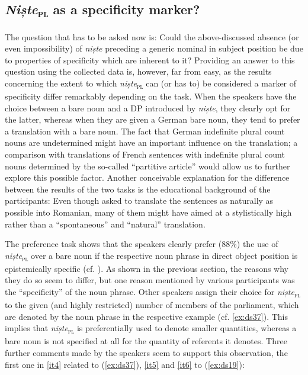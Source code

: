 \documentclass[output=paper,colorlinks,citecolor=brown]{langscibook}
\begin{document}
\subsection{\textit{Niște}\textsubscript{\textsc{pl}} as a specificity marker?}\label{sec:ds5.2}\largerpage
The question that has to be asked now is: Could the above-discussed absence (or even impossibility) of \textit{niște} preceding a generic nominal in subject position be due to properties of specificity which are inherent to it? Providing an answer to this question using the collected data is, however, far from easy, as the results concerning the extent to which \textit{niște}\textsubscript{\textsc{pl}} can (or has to) be considered a marker of specificity differ remarkably depending on the task. When the speakers have the choice between a bare noun and a DP introduced by \textit{niște}, they clearly opt for the latter, whereas when they are given a German bare noun, they tend to prefer a translation with a bare noun. The fact that German indefinite plural count nouns are undetermined might have an important influence on the translation; a comparison with translations of French sentences with indefinite plural count nouns determined by the so-called “partitive article” would allow us to further explore this possible factor. Another conceivable explanation for the difference between the results of the two tasks is the educational background of the participants: Even though asked to translate the sentences as naturally as possible into Romanian, many of them might have aimed at a stylistically high rather than a “spontaneous” and “natural” translation.

The preference task shows that the speakers clearly prefer (88\%) the use of \textit{niște}\textsc{\textsubscript{\textsc{pl}}} over a bare noun if the respective noun phrase in direct object position is epistemically specific (cf. ). As shown in the previous section, the reasons why they do so seem to differ, but one reason mentioned by various participants was the “specificity” of the noun phrase. Other speakers assign their choice for \textit{niște}\textsubscript{\textsc{pl}} to the given (and highly restricted) number of members of the parliament, which are denoted by the noun phrase in the respective example (cf. \ref{ex:ds37}). This implies that \textit{niște}\textsubscript{\textsc{pl}} is preferentially used to denote smaller quantities, whereas a bare noun is not specified at all for the quantity of referents it denotes. Three further comments made by the speakers seem to support this observation, the first one in \ref{it4} related to (\ref{ex:ds37}), \ref{it5} and \ref{it6} to (\ref{ex:ds19}):
\end{document}

